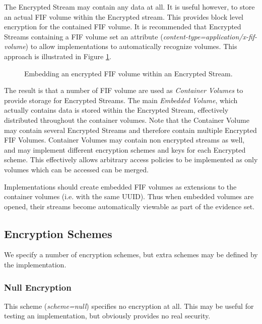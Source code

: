\documentclass[10pt, conference]{IEEEtran}
\begin{document}
The Encrypted Stream may contain any data at all. It is useful
however, to store an actual FIF volume within the Encrypted
stream. This provides block level encryption for the contained FIF
volume. It is recommended that Encrypted Streams containing a FIF
volume set an attribute ({\em content-type=application/x-fif-volume})
to allow implementations to automatically recognize volumes. This
approach is illustrated in Figure \ref{crypted_fif}.

\begin{figure}[tb]
  \begin{center}
  \mbox{\columnwidth {}}
  \caption{Embedding an encrypted FIF volume within an Encrypted Stream.}
  \label{crypted_fif}
  \end{center}
\end{figure}

The result is that a number of FIF volume are used as {\em Container
Volumes} to provide storage for Encrypted Streams. The main {\em
Embedded Volume}, which actually contains data is stored within the
Encrypted Stream, effectively distributed throughout the container
volumes. Note that the Container Volume may contain several Encrypted
Streams and therefore contain multiple Encrypted FIF
Volumes. Container Volumes may contain non encrypted streams as well,
and may implement different encryption schemes and keys for each
Encrypted scheme. This effectively allows arbitrary access policies to
be implemented as only volumes which can be accessed can be merged.

Implementations should create embedded FIF volumes as extensions to
the container volumes (i.e. with the same UUID). Thus when embedded
volumes are opened, their streams become automatically viewable as
part of the evidence set.

\subsection{Encryption Schemes}
We specify a number of encryption schemes, but extra schemes may be
defined by the implementation.

\subsubsection{Null Encryption}
This scheme ({\em scheme=null}) specifies no encryption at all. This
may be useful for testing an implementation, but obviously provides
no real security.
\end{document}
